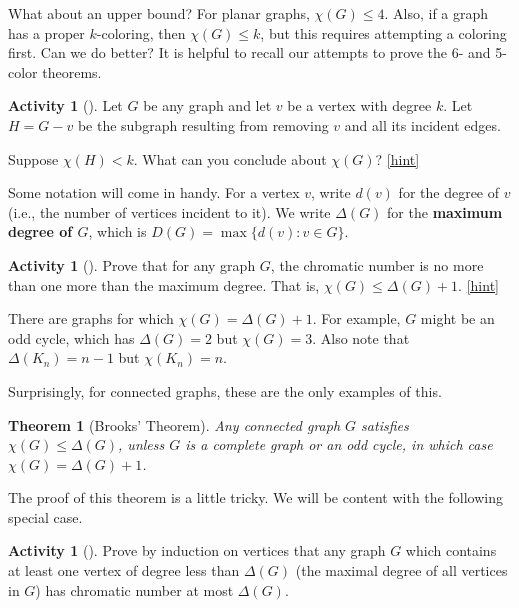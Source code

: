 \documentclass[10pt,]{book}
\newcommand{\terminology}[1]{\textbf{#1}}
\theoremstyle{plain}
\newtheorem{theorem}{Theorem}[section]
\theoremstyle{definition}
\theoremstyle{definition}
\theoremstyle{definition}
\newtheorem{activity}[project]{Activity}
\numberwithin{equation}{chapter}
\def\st{:}
\newcommand{\lt}{<}
\begin{document}
\hypertarget{p-384}{}%
What about an upper bound?  For planar graphs, \(\chi(G) \le 4\).  Also, if a graph has a proper \(k\)-coloring, then \(\chi(G) \le k\), but this requires attempting a coloring first.  Can we do better? It is helpful to recall our attempts to prove the 6- and 5-color theorems.%
\begin{activity}[]\label{activity-37}
\hypertarget{p-385}{}%
Let \(G\) be any graph and let \(v\) be a vertex with degree \(k\).  Let \(H = G - v\) be the subgraph resulting from removing \(v\) and all its incident edges.%
\par
\hypertarget{p-386}{}%
Suppose \(\chi(H) \lt k\).  What can you conclude about \(\chi(G)\)?%
\hfill{\tiny\hyperlink{a-44}{[hint]}\hypertarget{q-44}{}}\end{activity}
\hypertarget{p-388}{}%
Some notation will come in handy.  For a vertex \(v\), write \(d(v)\) for the degree of \(v\) (i.e., the number of vertices incident to it).  We write \(\Delta(G)\) for the \terminology{maximum degree of \(G\)}, which is \(D(G) = \max\{d(v) \st v \in G\}\).%
\begin{activity}[]\label{activity-38}
\hypertarget{p-389}{}%
Prove that for any graph \(G\), the chromatic number is no more than one more than the maximum degree.  That is, \(\chi(G) \le \Delta(G) + 1\).%
\hfill{\tiny\hyperlink{a-45}{[hint]}\hypertarget{q-45}{}}\end{activity}
\hypertarget{p-391}{}%
There are graphs for which \(\chi(G) = \Delta(G) + 1\).  For example, \(G\) might be an odd cycle, which has \(\Delta(G) = 2\) but \(\chi(G) = 3\).  Also note that \(\Delta(K_n) = n-1\) but \(\chi(K_n) = n\).%
\par
\hypertarget{p-392}{}%
Surprisingly, for connected graphs, these are the only examples of this.%
\begin{theorem}[{Brooks' Theorem}]\label{theorem-6}
\hypertarget{p-393}{}%
 Any connected graph \(G\) satisfies \(\chi(G) \le \Delta(G)\), unless \(G\) is a complete graph or an odd cycle, in which case \(\chi(G) = \Delta(G) + 1\).%
\end{theorem}
\hypertarget{p-394}{}%
The proof of this theorem is a little tricky.  We will be content with the following special case.%
\begin{activity}[]\label{activity-39}
\hypertarget{p-395}{}%
Prove by induction on vertices that any graph \(G\) which contains at least one vertex of degree less than \(\Delta(G)\) (the maximal degree of all vertices in \(G\)) has chromatic number at most \(\Delta(G)\).%
\end{activity}
\typeout{************************************************}
\typeout{************************************************}
\end{document}
